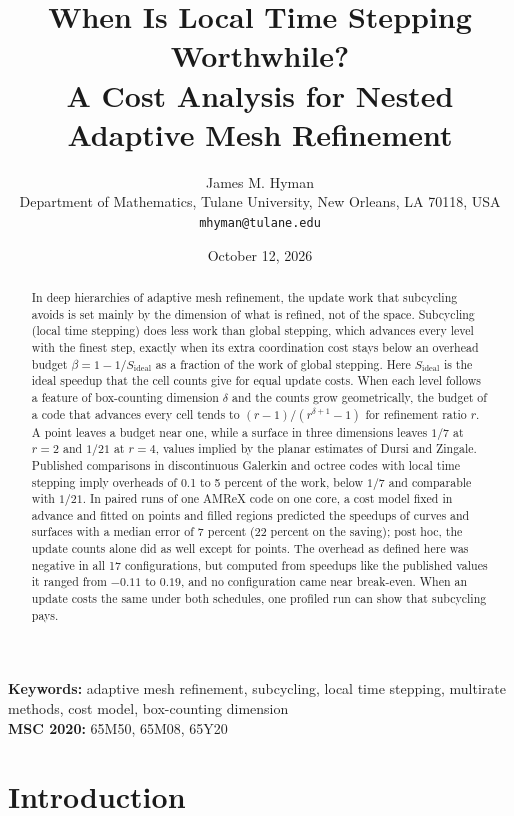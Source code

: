 \documentclass[12pt]{article}
\title{When Is Local Time Stepping Worthwhile?\\[4pt]
\large A Cost Analysis for Nested Adaptive Mesh Refinement}
\author{James M. Hyman\\[2pt]
\small Department of Mathematics, Tulane University, New Orleans, LA 70118, USA\\
\small\texttt{mhyman@tulane.edu}}
\date{October 12, 2026}
\theoremstyle{remark}
\newcommand{\Sid}{S_{\mathrm{ideal}}}
\begin{document}
\maketitle

\begin{abstract}
In deep hierarchies of adaptive mesh refinement, the update work that subcycling avoids is set mainly by the dimension of what is refined, not of the space. Subcycling (local time stepping) does less work than global stepping, which advances every level with the finest step, exactly when its extra coordination cost stays below an overhead budget $\beta=1-1/\Sid$ as a fraction of the work of global stepping. Here $\Sid$ is the ideal speedup that the cell counts give for equal update costs. When each level follows a feature of box-counting dimension $\delta$ and the counts grow geometrically, the budget of a code that advances every cell tends to $(r-1)/(r^{\delta+1}-1)$ for refinement ratio $r$. A point leaves a budget near one, while a surface in three dimensions leaves $1/7$ at $r=2$ and $1/21$ at $r=4$, values implied by the planar estimates of Dursi and Zingale. Published comparisons in discontinuous Galerkin and octree codes with local time stepping imply overheads of 0.1 to 5 percent of the work, below $1/7$ and comparable with $1/21$. In paired runs of one AMReX code on one core, a cost model fixed in advance and fitted on points and filled regions predicted the speedups of curves and surfaces with a median error of 7 percent (22 percent on the saving); post hoc, the update counts alone did as well except for points. The overhead as defined here was negative in all 17 configurations, but computed from speedups like the published values it ranged from $-0.11$ to $0.19$, and no configuration came near break-even. When an update costs the same under both schedules, one profiled run can show that subcycling pays.
\end{abstract}

\noindent\textbf{Keywords:} adaptive mesh refinement, subcycling, local time stepping, multirate methods, cost model, box-counting dimension\\
\textbf{MSC 2020:} 65M50, 65M08, 65Y20

\section{Introduction}\label{sec:intro}
\end{document}
